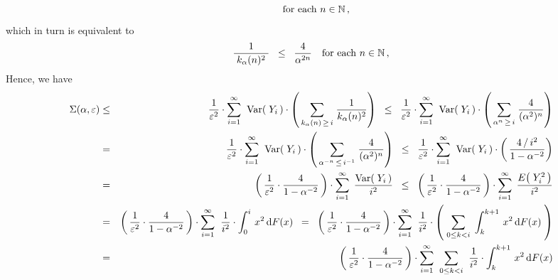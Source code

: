 \begin{enumerate}
\begin{equation*}
\quad
\textnormal{for each $n \in \mathbb{N}$}\,,
\end{equation*}
which in turn is equivalent to
\begin{equation*}
\dfrac{1}{{\color{white}.}k_{\alpha}(n)^{2}{\color{white}.}} \;\;\leq\;\; \dfrac{4}{\alpha^{2n}}
\quad
\textnormal{for each $n \in \N$}\,,
\end{equation*}
Hence, we have
\begin{eqnarray*}
\Sigma(\alpha,\varepsilon)
& \leq &
	\dfrac{1}{\varepsilon^{2}} \cdot
	\overset{\infty}{\underset{i=1}{\sum}}\;\;
	\Var\!\left(\;Y_{i}\,\right)
		\cdot
		\left(\,
			\underset{k_{\alpha}(n)\,\geq\,i}{\sum}\;
			\dfrac{1}{k_{\alpha}(n)^{2}}
			\right)
	\;\; \leq \;\;
	\dfrac{1}{\varepsilon^{2}} \cdot
	\overset{\infty}{\underset{i=1}{\sum}}\;\;
	\Var\!\left(\;Y_{i}\,\right)
		\cdot
		\left(\,
			\underset{\alpha^{n}\,\geq\,i}{\sum}\;
			\dfrac{4}{(\alpha^{2})^{n}}
			\right)
\\
& = &
	\dfrac{1}{\varepsilon^{2}} \cdot
	\overset{\infty}{\underset{i=1}{\sum}}\;\;
	\Var\!\left(\;Y_{i}\,\right)
		\cdot
		\left(\,
			\underset{\alpha^{-n}\,\leq\,i^{-1}}{\sum}\;
			\dfrac{4}{(\alpha^{2})^{n}}
			\right)
	\;\; \leq \;\;
	\dfrac{1}{\varepsilon^{2}} \cdot
	\overset{\infty}{\underset{i=1}{\sum}}\;\;
	\Var\!\left(\;Y_{i}\,\right)
		\cdot
		\left(\,
			\dfrac{4\,/\,i^{2}}{1-\alpha^{-2}}
			\right)
\\
& = &
	\left(\,\dfrac{1}{\varepsilon^{2}} \cdot \dfrac{4}{1-\alpha^{-2}}\,\right) \cdot
	\overset{\infty}{\underset{i=1}{\sum}}\;\,
	\dfrac{\Var\!\left(\;Y_{i}\,\right)}{i^{2}}
	\;\; \leq \;\;
	\left(\,\dfrac{1}{\varepsilon^{2}} \cdot \dfrac{4}{1-\alpha^{-2}}\,\right) \cdot
	\overset{\infty}{\underset{i=1}{\sum}}\;\,
	\dfrac{E\!\left(\;Y_{i}^{2}\,\right)}{i^{2}}
\\
& = &
	\left(\,\dfrac{1}{\varepsilon^{2}} \cdot \dfrac{4}{1-\alpha^{-2}}\,\right) \cdot
	\overset{\infty}{\underset{i=1}{\sum}}\;\;
	\dfrac{1}{i^{2}} \cdot \int_{0}^{i}\, x^{2} \,\d F(x)
	\;\; = \;\;
	\left(\,\dfrac{1}{\varepsilon^{2}} \cdot \dfrac{4}{1-\alpha^{-2}}\,\right) \cdot
	\overset{\infty}{\underset{i=1}{\sum}}\;\;
	\dfrac{1}{i^{2}} \cdot 
	\left(\;
		\underset{0 \leq k < i}{\sum}\;\int_{k}^{k+1}\, x^{2} \,\d F(x)
		\;\right)
\\
& = &
	\left(\,\dfrac{1}{\varepsilon^{2}} \cdot \dfrac{4}{1-\alpha^{-2}}\,\right) \cdot
	\overset{\infty}{\underset{i=1}{\sum}}\;\;
	\underset{0 \leq k < i}{\sum}\;\;
	\dfrac{1}{i^{2}} \cdot  \int_{k}^{k+1}\, x^{2} \,\d F(x)

\end{eqnarray*}
\end{enumerate}
